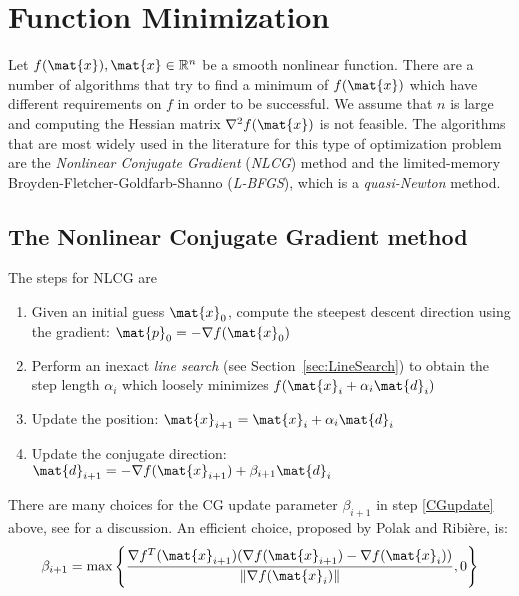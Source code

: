
%
%
%

\chapter{Function Minimization}\label{sec:Minimization}
Let $f(\mat{x}), \mat{x} \in \mathbb{R}^n$ be a smooth nonlinear function.
There are a number of algorithms that try to find a minimum of $f(\mat{x})$
which have different requirements on $f$ in order to be successful.
We assume that $n$ is large and computing the Hessian matrix
$\nabla^2 f(\mat{x})$ is not feasible.
The algorithms that are most widely used in the literature for this type of
optimization problem are the \emph{Nonlinear Conjugate Gradient} (\emph{NLCG})
method and the limited-memory Broyden-Fletcher-Goldfarb-Shanno (\emph{L-BFGS}),
which is a \emph{quasi-Newton} method.

\section{The Nonlinear Conjugate Gradient method}\label{sec:NLCG}
The steps for NLCG are
\begin{enumerate}
    \item Given an initial guess $\mat{x}_0$, compute the steepest descent
        direction using the gradient: $\mat{p}_0=-\nabla f(\mat{x}_0)$
    \item Perform an inexact \emph{line search} (see Section~\ref{sec:LineSearch}) to obtain the step
        length $\alpha_i$ which loosely minimizes $f(\mat{x}_i+\alpha_i \mat{d}_i)$
    \item Update the position: $\mat{x}_{i+1}=\mat{x}_i+\alpha_i \mat{d}_i$
    \item Update the conjugate direction: $\mat{d}_{i+1}=-\nabla f(\mat{x}_{i+1})+\beta_{i+1} \mat{d}_i$\label{CGupdate}
\end{enumerate}

\flushleft There are many choices for the CG update parameter $\beta_{i+1}$ in step
\ref{CGupdate} above, see \cite{Hager2006} for a discussion. An efficient
choice, proposed by Polak and Ribi\`{e}re, is:
\begin{equation*}
    \beta_{i+1}=\text{max}\left\{\frac{\nabla f^T(\mat{x}_{i+1})(\nabla f(\mat{x}_{i+1})-\nabla f(\mat{x}_i))}{\| \nabla f(\mat{x}_i)\|}, 0\right\}
\end{equation*}


